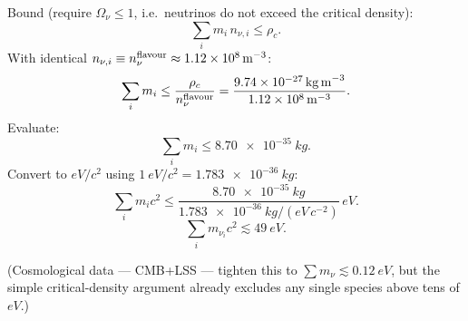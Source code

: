 \documentclass[11pt]{article}
\begin{document}
Bound (require $\Omega_\nu \le 1$, i.e.\ neutrinos do not exceed the critical density):
\[
\sum_i m_i\,n_{\nu,i}\le \rho_c.
\]
With identical $n_{\nu,i}\equiv n_\nu^{\rm flavour} \approx \SI{1.12e8}{m^{-3}}$:
\[
\sum_i m_i \le \frac{\rho_c}{n_\nu^{\rm flavour}} = \frac{\SI{9.74e-27}{kg\,m^{-3}}}{\SI{1.12e8}{m^{-3}}}.
\]
Evaluate:
\[
\sum_i m_i \le \SI{8.70e-35}{kg}.
\]
Convert to $\si{eV}/c^2$ using $\SI{1}{eV}/c^2 = \SI{1.783e-36}{kg}$:
\[
\sum_i m_i c^2 \le \frac{\SI{8.70e-35}{kg}}{\SI{1.783e-36}{kg/(eV\,c^{-2})}}\,\si{eV}.
\]
\[
\boxed{\;\sum_i m_{\nu_i} c^2 \lesssim \SI{49}{eV}.\;}
\]

(Cosmological data --- CMB+LSS --- tighten this to $\sum m_\nu \lesssim \SI{0.12}{eV}$, but the simple critical-density argument already excludes any single species above tens of $\si{eV}$.)
\end{document}
